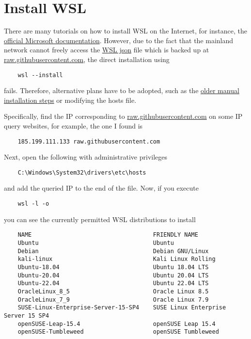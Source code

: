 \documentclass{report}
\begin{document}
\section{Install WSL}\label{sec:wsl.install}

There are many tutorials on how to install WSL on the Internet, for instance, the \href{https://learn.microsoft.com/zh-cn/windows/wsl/install}{official Microsoft documentation}. However, due to the fact that the mainland network cannot freely access the \href{https://raw.githubusercontent.com/microsoft/WSL/master/distributions/DistributionInfo.json}{WSL json} file which is backed up at \url{raw.githubusercontent.com}, the direct installation using
\begin{lstlisting}
	wsl --install
\end{lstlisting}
fails. Therefore, alternative plans have to be adopted, such as the \href{https://learn.microsoft.com/zh-cn/windows/wsl/install-manual}{older manual installation steps} or modifying the hosts file.

Specifically, find the IP corresponding to \url{raw.githubusercontent.com} on some IP query websites, for example, the one I found is
\begin{lstlisting}
	185.199.111.133 raw.githubusercontent.com
\end{lstlisting}
Next, open the following with administrative privileges
\begin{lstlisting}
	C:\Windows\System32\drivers\etc\hosts
\end{lstlisting}
and add the queried IP to the end of the file. Now, if you execute
\begin{lstlisting}
	wsl -l -o
\end{lstlisting}
you can see the currently permitted WSL distributions to install
\begin{lstlisting}
	NAME                                   FRIENDLY NAME
	Ubuntu                                 Ubuntu
	Debian                                 Debian GNU/Linux
	kali-linux                             Kali Linux Rolling
	Ubuntu-18.04                           Ubuntu 18.04 LTS
	Ubuntu-20.04                           Ubuntu 20.04 LTS
	Ubuntu-22.04                           Ubuntu 22.04 LTS
	OracleLinux_8_5                        Oracle Linux 8.5
	OracleLinux_7_9                        Oracle Linux 7.9
	SUSE-Linux-Enterprise-Server-15-SP4    SUSE Linux Enterprise Server 15 SP4
	openSUSE-Leap-15.4                     openSUSE Leap 15.4
	openSUSE-Tumbleweed                    openSUSE Tumbleweed
\end{lstlisting}
\end{document}
